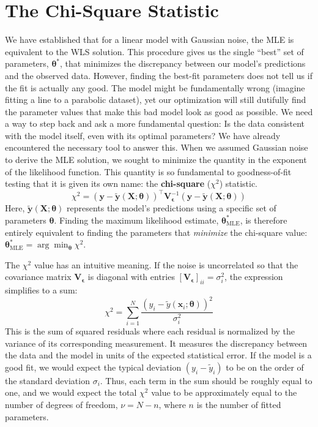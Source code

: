 \section{The Chi-Square Statistic}
We have established that for a linear model with Gaussian noise, the MLE is equivalent to the WLS solution. This procedure gives us the single ``best'' set of parameters, $\boldsymbol{\theta}^*$, that minimizes the discrepancy between our model's predictions and the observed data. However, finding the best-fit parameters does not tell us if the fit is actually any good. The model might be fundamentally wrong (imagine fitting a line to a parabolic dataset), yet our optimization will still dutifully find the parameter values that make this bad model look as good as possible. We need a way to step back and ask a more fundamental question: Is the data consistent with the model itself, even with its optimal parameters? We have already encountered the necessary tool to answer this. When we assumed Gaussian noise to derive the MLE solution, we sought to minimize the quantity in the exponent of the likelihood function. This quantity is so fundamental to goodness-of-fit testing that it is given its own name: the \textbf{chi-square} ($\chi^2$) statistic.
\begin{equation}
    \chi^2 = (\mathbf{y} - \tilde{\mathbf{y}}(\mathbf{X}; \boldsymbol{\theta}))^\top \mathbf{V}_{\boldsymbol{\epsilon}}^{-1} (\mathbf{y} - \tilde{\mathbf{y}}(\mathbf{X}; \boldsymbol{\theta}))
\end{equation}
Here, $\tilde{\mathbf{y}}(\mathbf{X}; \boldsymbol{\theta})$ represents the model's predictions using a specific set of parameters $\boldsymbol{\theta}$. Finding the maximum likelihood estimate, $\boldsymbol{\theta}_{\text{MLE}}^*$, is therefore entirely equivalent to finding the parameters that \textit{minimize} the chi-square value: $\boldsymbol{\theta}_{\text{MLE}}^* = \arg\min_{\boldsymbol{\theta}} \chi^2$.

The $\chi^2$ value has an intuitive meaning. If the noise is uncorrelated so that the covariance matrix $\mathbf{V}_{\boldsymbol{\epsilon}}$ is diagonal with entries $[\mathbf{V}_{\boldsymbol{\epsilon}}]_{ii} = \sigma_i^2$, the expression simplifies to a sum:
\begin{equation}
    \chi^2 = \sum_{i=1}^N \frac{(y_i - \tilde{y}(\mathbf{x}_i; \boldsymbol{\theta}))^2}{\sigma_i^2}
    \label{eq:chi-square-sum}
\end{equation}
This is the sum of squared residuals where each residual is normalized by the variance of its corresponding measurement. It measures the discrepancy between the data and the model in units of the expected statistical error. If the model is a good fit, we would expect the typical deviation $(y_i - \tilde{y}_i)$ to be on the order of the standard deviation $\sigma_i$. Thus, each term in the sum should be roughly equal to one, and we would expect the total $\chi^2$ value to be approximately equal to the number of degrees of freedom, $\nu = N - n$, where $n$ is the number of fitted parameters.

